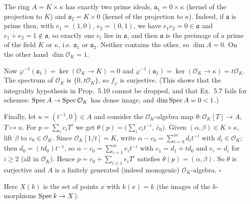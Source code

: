 \documentclass[11pt]{article}
\begin{document}
\pf
The ring $A=K\times\kappa$ has exactly two prime ideals, $\mathfrak a_1=0\times\kappa$ (kernel of the projection to $K$) and $\mathfrak a_2=K\times0$ (kernel of the projection to $\kappa$). Indeed, if $\mathfrak a$ is prime then, with $e_1=(1,0)$, $e_2=(0,1)$, we have $e_1e_2=0\in\mathfrak a$ and $e_1+e_2=1\notin\mathfrak a$, so exactly one $e_i$ lies in $\mathfrak a$, and then $\mathfrak a$ is the preimage of a prime of the field $K$ or $\kappa$, i.e. $\mathfrak a_1$ or $\mathfrak a_2$. Neither contains the other, so $\dim A=0$. On the other hand $\dim\mathcal O_K=1$.

Now $\varphi^{-1}(\mathfrak a_1)=\ker(\mathcal O_K\to K)=0$ and $\varphi^{-1}(\mathfrak a_2)=\ker(\mathcal O_K\to\kappa)=t\mathcal O_K$. The spectrum of $\mathcal O_K$ is $\{0,t\mathcal O_K\}$, so $f_\varphi$ is surjective. (This shows that the integrality hypothesis in Prop.~5.10 cannot be dropped, and that Ex.~5.7 fails for schemes: $\operatorname{Spec} A\to\operatorname{Spec}\mathcal O_K$ has dense image, and $\dim\operatorname{Spec} A=0<1$.)

Finally, let $u=(t^{-1},0)\in A$ and consider the $\mathcal O_K$-algebra map $\theta:\mathcal O_K[T]\to A$, $T\mapsto u$. For $p=\sum_{i}c_iT^i$ we get $\theta(p)=\bigl(\sum_ic_it^{-i},\ \bar c_0\bigr)$. Given $(\alpha,\beta)\in K\times\kappa$, lift $\beta$ to $c_0\in\mathcal O_K$. Since $\mathcal O_K[1/t]=K$, write $\alpha-c_0=\sum_{i=0}^md_it^{-i}$ with $d_i\in\mathcal O_K$; then $d_0=(td_0)t^{-1}$, so $\alpha-c_0=\sum_{i=1}^me_it^{-i}$ with $e_1=d_1+td_0$ and $e_i=d_i$ for $i\ge2$ (all in $\mathcal O_K$). Hence $p=c_0+\sum_{i\ge1}e_iT^i$ satisfies $\theta(p)=(\alpha,\beta)$. So $\theta$ is surjective and $A$ is a finitely generated (indeed monogenic) $\mathcal O_K$-algebra. \hfill$\square$

\pf
Here $X(k)$ is the set of points $x$ with $k(x)=k$ (the images of the $k$-morphisms $\operatorname{Spec} k\to X$).
\end{document}

